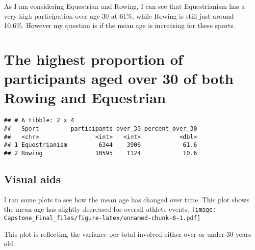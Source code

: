 \documentclass[]{article}
\newenvironment{Shaded}{\begin{snugshade}}{\end{snugshade}}
\newcommand{\KeywordTok}[1]{\textcolor[rgb]{0.13,0.29,0.53}{\textbf{#1}}}
\newcommand{\DataTypeTok}[1]{\textcolor[rgb]{0.13,0.29,0.53}{#1}}
\newcommand{\DecValTok}[1]{\textcolor[rgb]{0.00,0.00,0.81}{#1}}
\newcommand{\StringTok}[1]{\textcolor[rgb]{0.31,0.60,0.02}{#1}}
\newcommand{\OperatorTok}[1]{\textcolor[rgb]{0.81,0.36,0.00}{\textbf{#1}}}
\newcommand{\NormalTok}[1]{#1}
\begin{document}
As I am considering Equestrian and Rowing, I can see that Equestrianism
has a very high participation over age 30 at 61\%, while Rowing is still
just around 10.6\%. However my question is if the mean age is increasing
for these sports.

\section{The highest proportion of participants aged over 30 of both
Rowing and
Equestrian}\label{the-highest-proportion-of-participants-aged-over-30-of-both-rowing-and-equestrian}

\begin{Shaded}
\end{Shaded}

\begin{verbatim}
## # A tibble: 2 x 4
##   Sport         participants over_30 percent_over_30
##   <chr>                <int>   <int>           <dbl>
## 1 Equestrianism         6344    3906            61.6
## 2 Rowing               10595    1124            10.6
\end{verbatim}

\subsection{Visual aids}\label{visual-aids}

I ran some plots to see how the mean age has changed over time. This
plot shows the mean age has slightly decreased for overall athlete
events.
\texttt{[image: Capstone\_Final\_files/figure-latex/unnamed-chunk-8-1.pdf]}

This plot is reflecting the variance per total involved either over or
under 30 years old.
\end{document}
